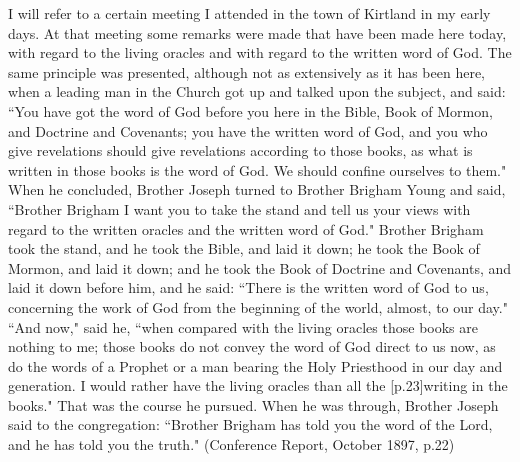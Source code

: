 \begin{displayquote}
I will refer to a certain meeting I attended in the town of Kirtland in my early 
days. At that meeting some remarks were made that have been made here today, with 
regard to the living oracles and with regard to the written word of God. The same 
principle was presented, although not as extensively as it has been here, when a 
leading man in the Church got up and talked upon the subject, and said: 
``You have got the word of God before you here in the Bible, Book of Mormon, and 
Doctrine and Covenants; you have the written word of God, and you who give 
revelations should give revelations according to those books, as what is written in 
those books is the word of God. We should confine ourselves to them." When he 
concluded, Brother Joseph turned to Brother Brigham Young and said, ``Brother 
Brigham I want you to take the stand and tell us your views with regard to the 
written oracles and the written word of God." Brother Brigham took the stand, and 
he took the Bible, and laid it down; he took the Book of Mormon, and laid it down; 
and he took the Book of Doctrine and Covenants, and laid it down before him, and he 
said: ``There is the written word of God to us, concerning the work of God from the 
beginning of the world, almost, to our day." ``And now," said he, ``when compared 
with the living oracles those books are nothing to me; those books do not convey 
the word of God direct to us now, as do the words of a Prophet or a man bearing the 
Holy Priesthood in our day and generation. I would rather have the living oracles 
than all the [p.23]writing in the books." That was the course he pursued. When he was 
through, Brother Joseph said to the congregation: ``Brother Brigham has told you the
word of the Lord, and he has told you the truth."  (Conference Report, 
  October 1897, p.22)
\end{displayquote}
